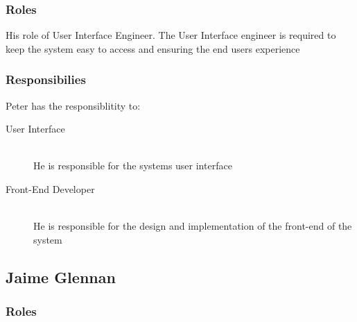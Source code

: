 
\subsubsection{Roles}

	His role of User Interface Engineer. The User Interface engineer is required to keep the system easy to access and ensuring the end users experience 


\subsubsection{Responsibilies}

	Peter has the responsiblitity to:

	\begin{description}
		\item[User Interface] \hfill \\ He is responsible for the systems user interface
		\item[Front-End Developer] \hfill \\ He is responsible for the design and implementation of the front-end of the system
	\end{description}


\subsection{Jaime Glennan}




\subsubsection{Roles}

